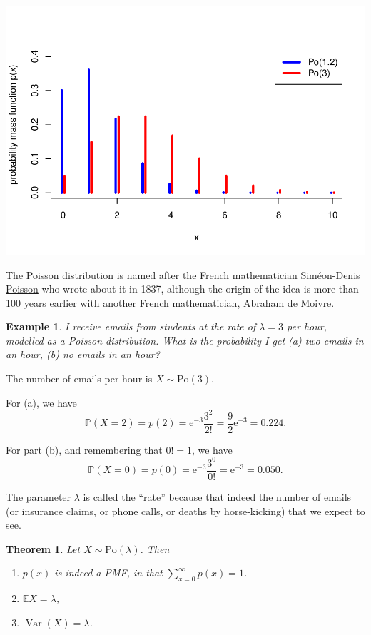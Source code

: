 \documentclass[
  a4paper,
]{book}
\providecommand{\tightlist}{%
  \setlength{\itemsep}{0pt}\setlength{\parskip}{0pt}}
\newtheorem{theorem}{Theorem}[chapter]
\theoremstyle{definition}
\theoremstyle{definition}
\newtheorem{example}{Example}[chapter]
\theoremstyle{definition}
\theoremstyle{definition}
\theoremstyle{remark}
\begin{document}
\includegraphics{math1710_files/figure-latex/po-pic-1.pdf}

The Poisson distribution is named after the French mathematician \href{https://mathshistory.st-andrews.ac.uk/Biographies/Poisson/}{Siméon-Denis Poisson} who wrote about it in 1837, although the origin of the idea is more than 100 years earlier with another French mathematician, \href{https://mathshistory.st-andrews.ac.uk/Biographies/De_Moivre/}{Abraham de Moivre}.

\begin{example}
\emph{I receive emails from students at the rate of \(\lambda = 3\) per hour, modelled as a Poisson distribution. What is the probability I get (a) two emails in an hour, (b) no emails in an hour?}

The number of emails per hour is \(X \sim \mathrm{Po}(3)\).

For (a), we have
\[ \mathbb P(X = 2) = p(2) = \mathrm{e}^{-3} \frac{3^2}{2!} = \frac92 \mathrm{e}^{-3} = 0.224 . \]

For part (b), and remembering that \(0! = 1\), we have
\[ \mathbb P(X = 0) = p(0) = \mathrm{e}^{-3} \frac{3^0}{0!} = \mathrm{e}^{-3} = 0.050 . \]
\end{example}

The parameter \(\lambda\) is called the ``rate'' because that indeed the number of emails (or insurance claims, or phone calls, or deaths by horse-kicking) that we expect to see.

\begin{theorem}

Let \(X \sim \text{Po}(\lambda)\). Then

\begin{enumerate}
\def\labelenumi{\arabic{enumi}.}
\tightlist
\item
  \(p(x)\) is indeed a PMF, in that \(\displaystyle\sum_{x=0}^\infty p(x) = 1\).
\item
  \(\mathbb EX = \lambda\),
\item
  \(\operatorname{Var}(X) = \lambda\).
\end{enumerate}

\end{theorem}
\end{document}
